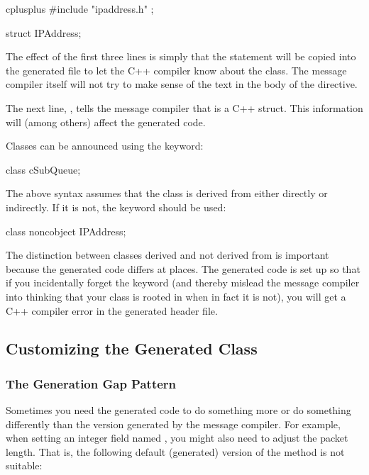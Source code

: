 \begin{msg}
cplusplus {{
#include "ipaddress.h"
}};

struct IPAddress;
\end{msg}

The effect of the first three lines is simply that the 
statement will be copied into the generated 
file to let the C++ compiler know about the  class.
The message compiler itself will not try to make sense of the
text in the body of the  directive.

The next line, , tells the message compiler that
 is a C++ struct. This information will (among others)
affect the generated code.

Classes can be announced using the  keyword:

\begin{msg}
class cSubQueue;
\end{msg}

The above syntax assumes that the class is derived from 
either directly or indirectly. If it is not, the 
keyword should be used:

\begin{msg}
class noncobject IPAddress;
\end{msg}

The distinction between classes derived and not derived from 
is important because the generated code differs at places.
The generated code is set up so that if you incidentally
forget the  keyword (and thereby mislead the
message compiler into thinking that your class is rooted in
 when in fact it is not), you will get a C++ compiler
error in the generated header file.


\subsection{Customizing the Generated Class}
\label{sec:ch-messages:customizing-generated-class}


\subsubsection{The Generation Gap Pattern}

Sometimes you need the generated code to do something
more or do something differently than the version generated
by the message compiler.
For example, when setting an integer field named ,
you might also need to adjust the packet length. That is,
the following default (generated) version of the
 method is not suitable:

